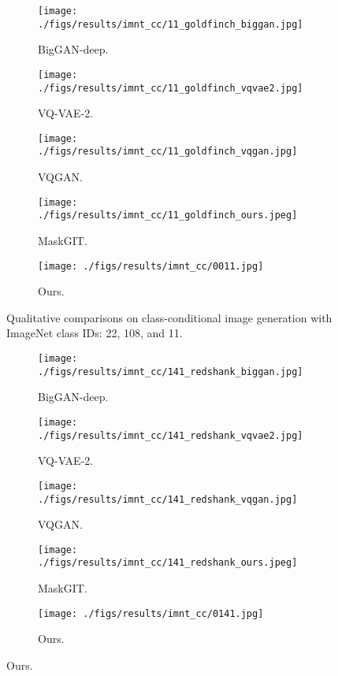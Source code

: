 \documentclass[10pt,twocolumn,letterpaper]{article}
\begin{document}
\begin{figure}[t]
    \centering
     \begin{subfigure}[b]{0.19\textwidth}
         \centering
         \texttt{[image: ./figs/results/imnt\_cc/11\_goldfinch\_biggan.jpg]}
         \caption{BigGAN-deep.}
     \end{subfigure}
     \begin{subfigure}[b]{0.19\textwidth}
         \centering
         \texttt{[image: ./figs/results/imnt\_cc/11\_goldfinch\_vqvae2.jpg]}
         \caption{VQ-VAE-2.}
     \end{subfigure}
     \begin{subfigure}[b]{0.19\textwidth}
         \centering
         \texttt{[image: ./figs/results/imnt\_cc/11\_goldfinch\_vqgan.jpg]}
         \caption{VQGAN.}
     \end{subfigure}
     \begin{subfigure}[b]{0.19\textwidth}
         \centering
         \texttt{[image: ./figs/results/imnt\_cc/11\_goldfinch\_ours.jpeg]}
         \caption{MaskGIT.}
     \end{subfigure}
     \begin{subfigure}[b]{0.19\textwidth}
         \centering
         \texttt{[image: ./figs/results/imnt\_cc/0011.jpg]}
         \caption{Ours.}
     \end{subfigure}
\caption{Qualitative comparisons on class-conditional image generation with ImageNet class IDs: 22, 108, and 11.}
\label{fig:conds_app}
\end{figure}

\clearpage

\begin{figure}[t]
    \centering
     \begin{subfigure}[b]{0.19\textwidth}
         \centering
         \texttt{[image: ./figs/results/imnt\_cc/141\_redshank\_biggan.jpg]}
         \caption{BigGAN-deep.}
     \end{subfigure}
     \begin{subfigure}[b]{0.19\textwidth}
         \centering
         \texttt{[image: ./figs/results/imnt\_cc/141\_redshank\_vqvae2.jpg]}
         \caption{VQ-VAE-2.}
     \end{subfigure}
     \begin{subfigure}[b]{0.19\textwidth}
         \centering
         \texttt{[image: ./figs/results/imnt\_cc/141\_redshank\_vqgan.jpg]}
         \caption{VQGAN.}
     \end{subfigure}
     \begin{subfigure}[b]{0.19\textwidth}
         \centering
         \texttt{[image: ./figs/results/imnt\_cc/141\_redshank\_ours.jpeg]}
         \caption{MaskGIT.}
     \end{subfigure}
     \begin{subfigure}[b]{0.19\textwidth}
         \centering
         \texttt{[image: ./figs/results/imnt\_cc/0141.jpg]}
         \caption{Ours.}
     \end{subfigure}
\end{figure}
\end{document}
